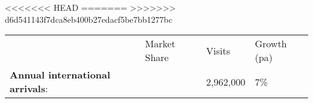 <<<<<<< HEAD
=======
>>>>>>> d6d541143f7dca8eb400b27edacf5be7bb1277bc
\begin{tabular}[t]{p{2.95cm}>{\hfill}p{1.35cm}>{\hfill}p{1.1cm}>{\hfill}p{1.7cm}}
   & Market Share & Visits & Growth (pa) \\ 
 \textbf{Annual international arrivals}: &   & 2,962,000 & 7\% \\ 
  \end{tabular}

